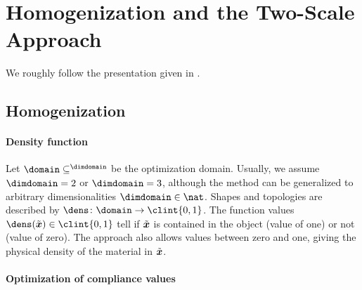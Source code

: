 \section{Homogenization and the Two-Scale Approach}
\label{sec:61homogenization}


\noindent
We roughly follow the presentation given in
.



\subsection{Homogenization}
\label{sec:611homogenization}

\paragraph{Density function}

Let $\domain \subset \real^{\dimdomain}$ be the optimization domain.
Usually, we assume $\dimdomain = 2$ or $\dimdomain = 3$,
although the method can be generalized to
arbitrary dimensionalities $\dimdomain \in \nat$.
Shapes and topologies are described by 
$\dens\colon \domain \to \clint{0, 1}$.
The function values $\dens(\tilde{\*x}) \in \clint{0, 1}$ tell if $\tilde{{\boldsymbol{x}}}$
is contained in the object (value of one) or not (value of zero).
The  approach also allows values between
zero and one, giving the physical density of the material in $\tilde{{\boldsymbol{x}}}$.

\paragraph{Optimization of compliance values}

